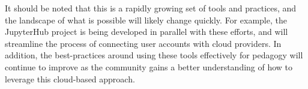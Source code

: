 \begin{enumerate}
It should be noted that this is a rapidly growing set of tools and practices,
and the landscape of what is possible will likely change quickly. For example,
the JupyterHub project\cite{perez2015project} is being developed in parallel with
these efforts, and will streamline the process of connecting user
accounts with cloud providers. In addition, the best-practices around using
these tools effectively for pedagogy will continue to improve as the community
gains a better understanding of how to leverage this cloud-based approach.

\end{enumerate}
